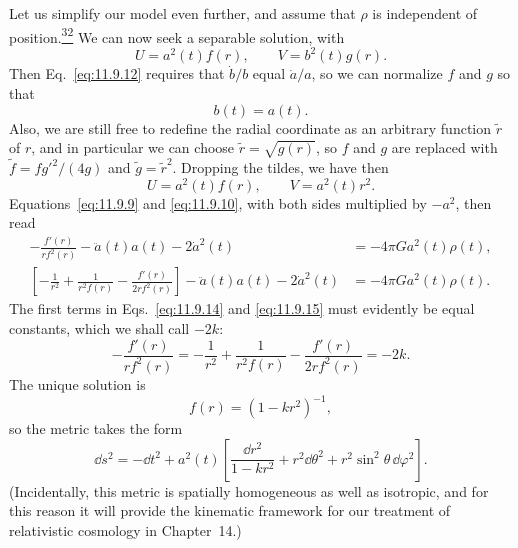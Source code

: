 Let us simplify our model even further, and assume that \(\rho\) is
independent of position.\hyperref[ch11-ref-32]{\textsuperscript{32}} We can
now seek a separable solution, with
\[
  U=a^2(t)f(r),\qquad V=b^2(t)g(r).
\]
Then Eq.~\eqref{eq:11.9.12} requires that \(\dot b/b\) equal \(\dot a/a\),
so we can normalize \(f\) and \(g\) so that
\[
  b(t)=a(t).
\]
Also, we are still free to redefine the radial coordinate as an arbitrary
function \(\tilde r\) of \(r\), and in particular we can choose
\(\tilde r=\sqrt{g(r)}\), so \(f\) and \(g\) are replaced with
\(\tilde f=fg'^2/(4g)\) and \(\tilde g=\tilde r^2\). Dropping the tildes,
we have then
\begin{equation}
  U=a^2(t)f(r),\qquad V=a^2(t)r^2.
  \tag{11.9.13}\label{eq:11.9.13}
\end{equation}
Equations~\eqref{eq:11.9.9} and \eqref{eq:11.9.10}, with both sides
multiplied by \(-a^2\), then read
\begin{align}
  -\frac{f'(r)}{rf^2(r)}
  -\ddot a(t)a(t)-2\dot a^2(t)
  &=-4\pi G a^2(t)\rho(t),
  \tag{11.9.14}\label{eq:11.9.14}\\
  \left[
    -\frac1{r^2}
    +\frac1{r^2f(r)}
    -\frac{f'(r)}{2rf^2(r)}
  \right]
  -\ddot a(t)a(t)-2\dot a^2(t)
  &=-4\pi G a^2(t)\rho(t).
  \tag{11.9.15}\label{eq:11.9.15}
\end{align}
The first terms in Eqs.~\eqref{eq:11.9.14} and \eqref{eq:11.9.15} must
evidently be equal constants, which we shall call \(-2k\):
\[
  -\frac{f'(r)}{rf^2(r)}
  =
  -\frac1{r^2}+\frac1{r^2f(r)}
  -\frac{f'(r)}{2rf^2(r)}
  =-2k.
\]
The unique solution is
\[
  f(r)=(1-kr^2)^{-1},
\]
so the metric takes the form
\begin{equation}
  \dd s^2
  =
  -\dd t^2+a^2(t)
  \left[
    \frac{\dd r^2}{1-kr^2}
    +r^2\dd\theta^2+r^2\sin^2\theta\,\dd\varphi^2
  \right].
  \tag{11.9.16}\label{eq:11.9.16}
\end{equation}
(Incidentally, this metric is spatially homogeneous as well as isotropic, and
for this reason it will provide the kinematic framework for our treatment of
relativistic cosmology in Chapter~14.)

